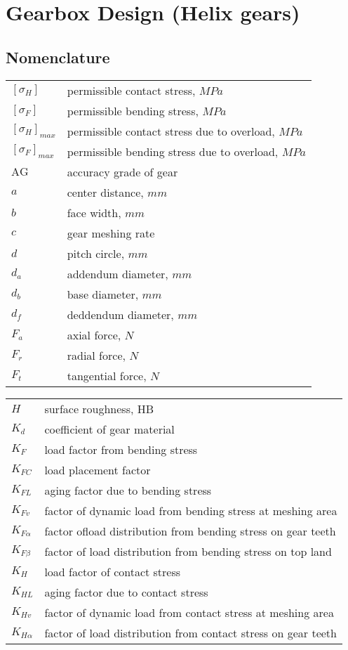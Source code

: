 \chapter{Gearbox Design (Helix gears)}
\section{Nomenclature}
	\begin{tabular}[t]{lp{7cm}}
		$ [\sigma_H] $ & permissible contact stress, $ MPa $\\
		$ [\sigma_F] $ & permissible bending stress, $ MPa $\\
		$ [\sigma_H]_{max} $ & permissible contact stress due to overload, $ MPa $\\
		$ [\sigma_F]_{max} $ & permissible bending stress due to overload, $ MPa $\\
		$ \text{AG} $ & accuracy grade of gear\\
		$ a $ & center distance, $ mm $\\
		$ b $ & face width, $ mm $\\
		$ c $ & gear meshing rate\\
		$ d $ & pitch circle, $ mm $\\
		$ d_a $ & addendum diameter, $ mm $\\
		$ d_b $ & base diameter, $ mm $\\
		$ d_f $ & deddendum diameter, $ mm $\\
		$ F_a $ & axial force, $ \unit{N} $\\
		$ F_r $ & radial force, $ \unit{N} $\\
		$ F_t $ & tangential force, $ \unit{N} $\\		
	\end{tabular}
	\begin{tabular}[t]{lp{7cm}}
		$ H $ & surface roughness, HB\\
		$ K_d $ & coefficient of gear material\\	
		$ K_F $ & load factor from bending stress\\
		$ K_{FC} $ & load placement factor\\
		$ K_{FL} $ & aging factor due to bending stress\\
		$ K_{Fv} $ & factor of dynamic load from bending stress at meshing area\\
		$ K_{F\alpha} $ & factor ofload distribution from bending stress on gear teeth\\
		$ K_{F\beta} $ & factor of load distribution from bending stress on top land\\
		$ K_H $ & load factor of contact stress\\
		$ K_{HL} $ & aging factor due to contact stress\\
		$ K_{Hv} $ & factor of dynamic load from contact stress at meshing area\\
		$ K_{H\alpha} $ & factor of load distribution from contact stress on gear teeth\\
	\end{tabular}\newpage
